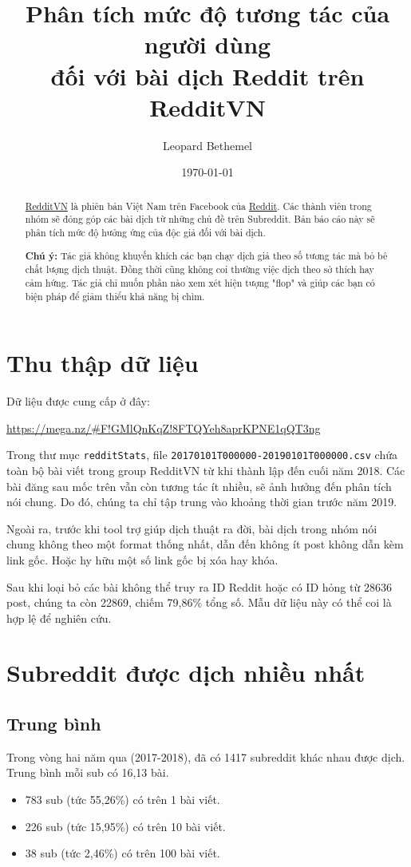 \documentclass[10pt,a4paper]{article}
\author{Leopard Bethemel}
\title{Phân tích mức độ tương tác của người dùng\\đối với bài dịch Reddit trên RedditVN}
\date{\today}
\begin{document}
\maketitle
\renewcommand{\contentsname}{Mục lục}
\tableofcontents
\begin{abstract}
    \href{https://www.facebook.com/groups/redditvietnam/}{RedditVN} là phiên bản Việt Nam trên Facebook của \href{https://www.reddit.com/}{Reddit}. Các thành viên trong nhóm sẽ đóng góp các bài dịch từ những chủ đề trên Subreddit. Bản báo cáo này sẽ phân tích mức độ hưởng ứng của độc giả đối với bài dịch.

    \textbf{Chú ý:} Tác giả không khuyến khích các bạn chạy dịch giả theo số tương tác mà bỏ bê chất lượng dịch thuật. Đồng thời cũng không coi thường việc dịch theo sở thích hay cảm hứng. Tác giả chỉ muốn phần nào xem xét hiện tượng "flop" và giúp các bạn có biện pháp để giảm thiểu khả năng bị chìm.
\end{abstract}

\clearpage
\section{Thu thập dữ liệu}
Dữ liệu được cung cấp ở đây:

\href{https://mega.nz/#F!GMlQnKqZ!8FTQYeh8aprKPNE1qQT3ng}{https://mega.nz/\#F!GMlQnKqZ!8FTQYeh8aprKPNE1qQT3ng}

Trong thư mục \texttt{redditStats}, file \texttt{20170101T000000-20190101T000000.csv} chứa toàn bộ bài viết trong group RedditVN từ khi thành lập đến cuối năm 2018. Các bài đăng sau mốc trên vẫn còn tương tác ít nhiều, sẽ ảnh hưởng đến phân tích nói chung. Do đó, chúng ta chỉ tập trung vào khoảng thời gian trước năm 2019.

Ngoài ra, trước khi tool trợ giúp dịch thuật ra đời, bài dịch trong nhóm nói chung không theo một format thống nhất, dẫn đến không ít post không dẫn kèm link gốc. Hoặc hy hữu một số link gốc bị xóa hay khóa.

Sau khi loại bỏ các bài không thể truy ra ID Reddit hoặc có ID hỏng từ 28636 post, chúng ta còn 22869, chiếm 79,86\% tổng số. Mẫu dữ liệu này có thể coi là hợp lệ để nghiên cứu.

\section{Subreddit được dịch nhiều nhất}
\subsection{Trung bình}
Trong vòng hai năm qua (2017-2018), đã có 1417 subreddit khác nhau được dịch. Trung bình mỗi sub có 16,13 bài.
\begin{itemize}
    \item 783 sub (tức 55,26\%) có trên 1 bài viết.
    \item 226 sub (tức 15,95\%) có trên 10 bài viết.
    \item 38 sub (tức 2,46\%) có trên 100 bài viết.
\end{itemize}
\end{document}
